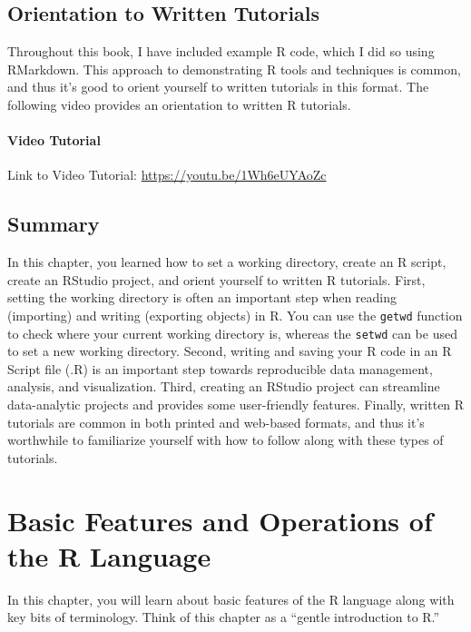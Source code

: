 \documentclass[]{book}
\begin{document}
\section{Orientation to Written
Tutorials}\label{orientation-to-written-tutorials}

Throughout this book, I have included example R code, which I did so
using RMarkdown. This approach to demonstrating R tools and techniques
is common, and thus it's good to orient yourself to written tutorials in
this format. The following video provides an orientation to written R
tutorials.

\subsubsection{Video Tutorial}\label{video-tutorial-4}

Link to Video Tutorial: \url{https://youtu.be/1Wh6eUYAoZc}

\section{Summary}\label{summary}

In this chapter, you learned how to set a working directory, create an R
script, create an RStudio project, and orient yourself to written R
tutorials. First, setting the working directory is often an important
step when reading (importing) and writing (exporting objects) in R. You
can use the \texttt{getwd} function to check where your current working
directory is, whereas the \texttt{setwd} can be used to set a new
working directory. Second, writing and saving your R code in an R Script
file (.R) is an important step towards reproducible data management,
analysis, and visualization. Third, creating an RStudio project can
streamline data-analytic projects and provides some user-friendly
features. Finally, written R tutorials are common in both printed and
web-based formats, and thus it's worthwhile to familiarize yourself with
how to follow along with these types of tutorials.

\hypertarget{gentleintro}{\chapter{Basic Features and Operations of the
R Language}\label{gentleintro}}

In this chapter, you will learn about basic features of the R language
along with key bits of terminology. Think of this chapter as a ``gentle
introduction to R.''
\end{document}
